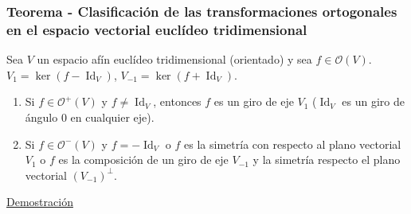 \documentclass[12pt, a4paper, ones, notitlepage, openany,titlepage]{article}
\newcommand{\demostracion}{\noindent\underline{Demostración}}
\begin{document}
\subsubsection{Teorema - Clasificación de las transformaciones ortogonales en el espacio vectorial euclídeo tridimensional}
Sea $V$ un espacio afín euclídeo tridimensional (orientado) y sea $f \in \mathcal{O}(V)$. $V_1 = \ker (f-\operatorname{Id}_V)$, $V_{-1} = \ker (f+\operatorname{Id}_V)$.
\begin{enumerate}[label=(\arabic*)]
	\item Si $f \in \mathcal{O}^+(V)$ y $f \neq \operatorname{Id}_V$, entonces $f$ es un giro de eje $V_1$ ($\operatorname{Id}_V$ es un giro de ángulo $0$ en cualquier eje).
	\item Si $f \in \mathcal{O}^-(V)$ y $f = -\operatorname{Id}_V$ o $f$ es la simetría con respecto al plano vectorial $V_1$ o $f$ es la composición de un giro de eje $V_{-1}$ y la simetría respecto el plano vectorial $(V_{-1})^\perp$.
\end{enumerate}
\demostracion
\end{document}
